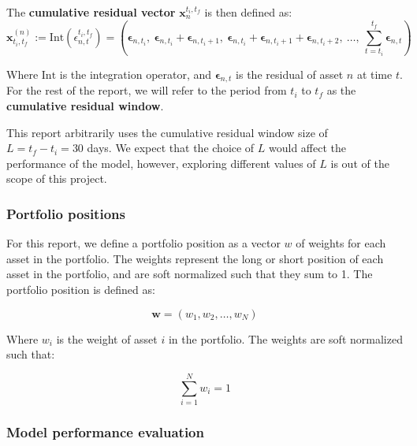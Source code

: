 \documentclass[12pt]{article}
\begin{document}
\noindent
The \textbf{cumulative residual vector} $\mathbf{x}_n^{t_i, t_f}$ is then defined as:
\begin{equation}
    \mathbf{x}_{t_i,t_f}^{(n)} := \mathrm{Int}(\epsilon^{t_i, t_f}_{n,t}) 
      = \left( \mathbf{\epsilon}_{n,t_i},\ \mathbf{\epsilon}_{n,t_i} + \mathbf{\epsilon}_{n,t_i+1},\ \mathbf{\epsilon}_{n,t_i} + \mathbf{\epsilon}_{n,t_i+1} + \mathbf{\epsilon}_{n,t_i+2},\ \ldots,\ \sum_{t=t_i}^{t_f} \mathbf{\epsilon}_{n,t} \right)
    \label{eq:cumulative_residual}
\end{equation}

\noindent
Where $\mathrm{Int}$ is the integration operator, and $\mathbf{\epsilon}_{n,t}$ is the residual of asset $n$ at time $t$. For the rest of the report, we will refer to the period from $t_i$ to $t_f$ as the \textbf{cumulative residual window}.

\vspace{10pt}
\noindent
This report arbitrarily uses the cumulative residual window size of $L=t_f-t_i=30$ days. We expect that the choice of $L$ would affect the performance of the model, however, exploring different values of $L$ is out of the scope of this project.

\subsubsection{Portfolio positions}

For this report, we define a portfolio position as a vector $w$ of weights for each asset in the portfolio. The weights represent the long or short position of each asset in the portfolio, and are soft normalized such that they sum to 1. The portfolio position is defined as:

\begin{equation}
    \mathbf{w} = (w_1, w_2, \ldots, w_N)
    \label{eq:portfolio_weights}
\end{equation}

\noindent
Where $w_i$ is the weight of asset $i$ in the portfolio. The weights are soft normalized such that:

\begin{equation}
    \sum_{i=1}^{N} w_i = 1
    \label{eq:portfolio_weights_normalization}
\end{equation}

\subsubsection{Model performance evaluation} 
\end{document}
